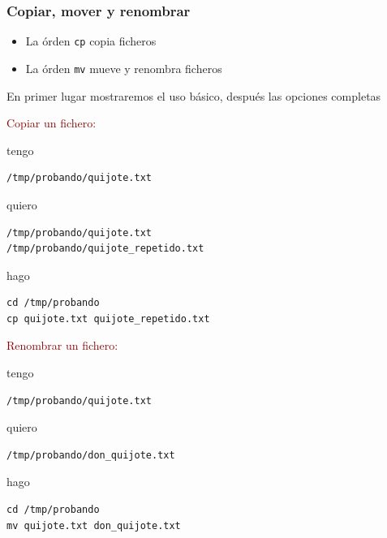 \documentclass[ucs]{beamer}
\newcommand{\res}[1]{\textcolor{darkred}{#1}}
\begin{document}
\begin{frame}[fragile]
\frametitle{Copiar, mover y renombrar}

\begin{itemize}
\item
La órden \verb|cp| copia ficheros
\item
La órden \verb|mv| mueve y renombra ficheros
\end{itemize}

En primer lugar mostraremos el uso básico, después
las opciones completas


\res{Copiar un fichero:}

tengo 
  \begin{footnotesize}
  \begin{verbatim}
/tmp/probando/quijote.txt
  \end{verbatim}
  \end{footnotesize}

quiero 
  \begin{footnotesize}
  \begin{verbatim}
/tmp/probando/quijote.txt
/tmp/probando/quijote_repetido.txt
  \end{verbatim}
  \end{footnotesize}

hago
  \begin{footnotesize}
  \begin{verbatim}
cd /tmp/probando
cp quijote.txt quijote_repetido.txt
  \end{verbatim}
  \end{footnotesize}

\end{frame}
\begin{frame}[fragile]

\res{Renombrar un fichero:}

tengo 
  \begin{footnotesize}
  \begin{verbatim}
/tmp/probando/quijote.txt
  \end{verbatim}
  \end{footnotesize}
quiero 
  \begin{footnotesize}
  \begin{verbatim}
/tmp/probando/don_quijote.txt
  \end{verbatim}
  \end{footnotesize}

hago
  \begin{footnotesize}
  \begin{verbatim}
cd /tmp/probando
mv quijote.txt don_quijote.txt
  \end{verbatim}
  \end{footnotesize}


\end{frame}
\end{document}
